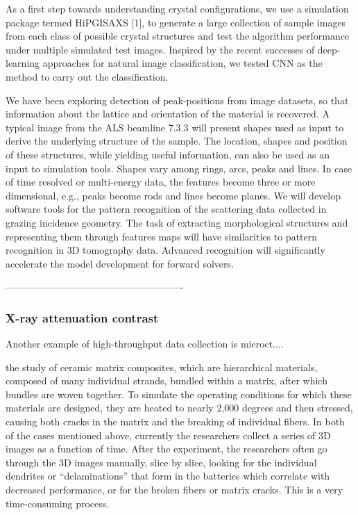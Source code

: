 As a first step towards understanding crystal configurations, we use a simulation package termed HiPGISAXS [1], to generate a large collection of sample images from each class of possible crystal structures and test the algorithm performance under multiple simulated test images. Inspired by the
recent successes of deep-learning approaches for natural image classification, we tested CNN as the method to carry out the classification.

We have been exploring detection of peak-positions from image datasets, so that information about the lattice and orientation of the material is recovered. A typical image from the ALS beamline 7.3.3 will present shapes used as input to derive the underlying structure of the sample. The location, shapes and position of these structures, while yielding useful information, can also be used as an input to simulation tools. Shapes vary among rings, arcs, peaks and lines. In case of time resolved or multi-energy data, the features become three or more dimensional, e.g., peaks become rods and lines become planes. We will develop software tools for the pattern recognition of the scattering data collected in grazing incidence geometry. The task of extracting morphological structures and representing them through features maps will have similarities to pattern recognition in 3D tomography data. Advanced recognition will significantly accelerate the model development for forward solvers.

-------------------------------------------------------
\subsubsection{X-ray attenuation contrast}\label{subsec:microct}
Another example of high-throughput data collection is microct....


the study of ceramic matrix composites, which are hierarchical materials, composed of many individual strands, bundled within a matrix, after which bundles are woven together. To simulate the operating conditions for which these materials are designed, they are heated to nearly 2,000 degrees and then stressed, causing both cracks in the matrix and the breaking of individual fibers. In both of the cases mentioned above, currently the researchers collect a series of 3D images as a function of time. After the experiment, the researchers often go through the 3D images manually, slice by slice, looking for the individual dendrites or “delaminations” that form in the batteries which correlate with decreased performance, or for the broken fibers or matrix cracks. This is a very time-consuming process.

